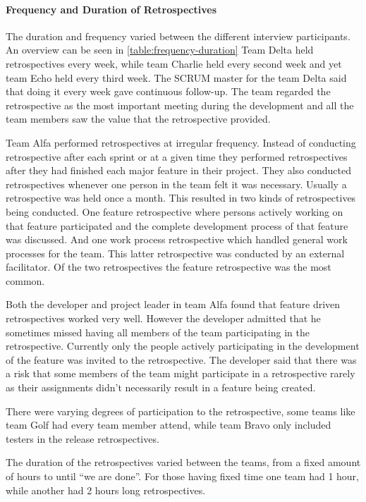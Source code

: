 \label{question-3a}
\paragraph{Frequency and Duration of Retrospectives}
The duration and frequency varied between the different interview participants. An overview can be seen in \autoref{table:frequency-duration} Team Delta held retrospectives every week, while team Charlie held every second week and yet team Echo held every third week. The SCRUM master for the team Delta said that doing it every week gave continuous follow-up. The team regarded the retrospective as the most important meeting during the development and all the team members saw the value that the retrospective provided. 

Team Alfa performed retrospectives at irregular frequency. Instead of conducting retrospective after each sprint or at a given time they performed retrospectives after they had finished each major feature in their project. They also conducted retrospectives whenever one person in the team felt it was necessary. Usually a retrospective was held once a month. This resulted in two kinds of retrospectives being conducted. One feature retrospective where persons actively working on that feature participated and the complete development process of that feature was discussed. And one work process retrospective which handled general work processes for the team. This latter retrospective was conducted by an external facilitator. Of the two retrospectives the feature retrospective was the most common. 

Both the developer and project leader in team Alfa found that feature driven retrospectives worked very well. However the developer admitted that he sometimes missed having all members of the team participating in the retrospective. Currently only the people actively participating in the development of the feature was invited to the retrospective. The developer said that there was a risk that some members of the team might participate in a retrospective rarely as their assignments didn't necessarily result in a feature being created. 

There were varying degrees of participation to the retrospective, some teams like team Golf had every team member attend, while team Bravo only included testers in the release retrospectives. 

\label{question-3b}
The duration of the retrospectives varied between the teams, from a fixed amount of hours to until ``we are done''. For those having fixed time one team had 1 hour, while another had 2 hours long retrospectives. 

